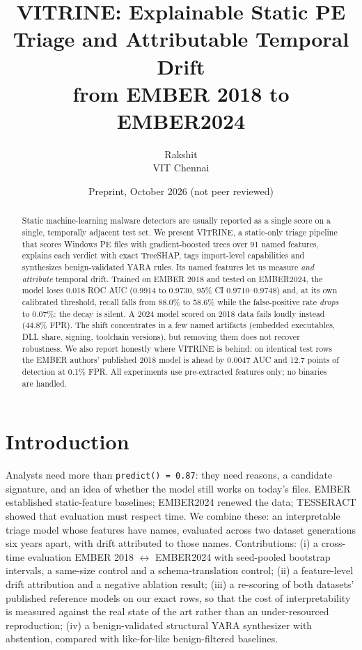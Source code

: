 \documentclass[10pt]{article}
\title{VITRINE: Explainable Static PE Triage and Attributable Temporal Drift\\from EMBER 2018 to EMBER2024}
\author{Rakshit\\VIT Chennai}
\date{Preprint, October 2026 (not peer reviewed)}
\begin{document}
\maketitle

\begin{abstract}
Static machine-learning malware detectors are usually reported as a single score on a single,
temporally adjacent test set. We present VITRINE, a static-only triage pipeline that scores Windows PE
files with gradient-boosted trees over 91 named features, explains each verdict with exact TreeSHAP,
tags import-level capabilities and synthesizes benign-validated YARA rules. Its named features let us
measure \emph{and attribute} temporal drift. Trained on EMBER 2018 and tested on EMBER2024, the model
loses 0.018 ROC AUC (0.9914 to 0.9730, 95\% CI 0.9710--0.9748) and, at its own calibrated threshold,
recall falls from 88.0\% to 58.6\% while the false-positive rate \emph{drops} to 0.07\%: the decay is
silent. A 2024 model scored on 2018 data fails loudly instead (44.8\% FPR). The shift concentrates in
a few named artifacts (embedded executables, DLL share, signing, toolchain versions), but removing them
does not recover robustness. We also report honestly where VITRINE is behind: on identical test rows the
EMBER authors' published 2018 model is ahead by 0.0047 AUC and 12.7 points of detection at 0.1\% FPR.
All experiments use pre-extracted features only; no binaries are handled.
\end{abstract}

\section{Introduction}
Analysts need more than \texttt{predict() = 0.87}: they need reasons, a candidate signature, and an
idea of whether the model still works on today's files. EMBER \citep{anderson2018ember} established
static-feature baselines; EMBER2024 \citep{joyce2025ember2024} renewed the data; TESSERACT
\citep{pendlebury2019tesseract} showed that evaluation must respect time. We combine these: an
interpretable triage model whose features have names, evaluated across two dataset generations six
years apart, with drift attributed to those names. Contributions: (i) a cross-time evaluation
EMBER 2018 $\leftrightarrow$ EMBER2024 with seed-pooled bootstrap intervals, a same-size control and a
schema-translation control; (ii) a feature-level drift attribution and a negative ablation result;
(iii) a re-scoring of both datasets' published reference models on our exact rows, so that the cost
of interpretability is measured against the real state of the art rather than an under-resourced
reproduction; (iv) a benign-validated structural YARA synthesizer with abstention, compared with
like-for-like benign-filtered baselines.
\end{document}
